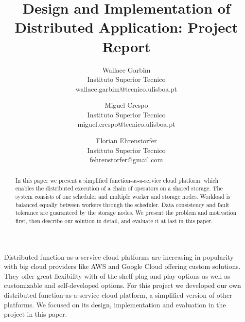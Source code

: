 \documentclass[times, 10pt,twocolumn]{article}
\begin{document}
\title{Design and Implementation of Distributed Application: Project Report}

\author{
Wallace Garbim\\Instituto Superior Tecnico\\wallace.garbim@tecnico.ulisboa.pt
\and
Miguel Crespo\\Instituto Superior Tecnico\\miguel.crespo@tecnico.ulisboa.pt
\and
Florian Ehrenstorfer\\
Instituto Superior Tecnico\\fehrenstorfer@gmail.com\\
}

\maketitle
\thispagestyle{empty}

\begin{abstract}
In this paper we present a simplified function-as-a-service cloud platform, which enables the distributed execution of a chain of operators on a shared storage. 
The system consists of one scheduler and multiple worker and storage nodes.
Workload is balanced equally between workers through the scheduler.
Data consistency and fault tolerance are guaranteed by the storage nodes.
We present the problem and motivation first, then describe our solution in detail, and evaluate it at last in this paper.
\end{abstract}
Distributed function-as-a-service cloud platforms are increasing in popularity with big cloud providers like AWS and Google Cloud offering custom solutions.
They offer great flexibility with of the shelf plug and play options as well as customizable and self-developed options.
For this project we developed our own distributed function-as-a-service cloud platform, a simplified version of other platforms.
We focused on its design, implementation and evaluation in the project in this paper.
\end{document}
